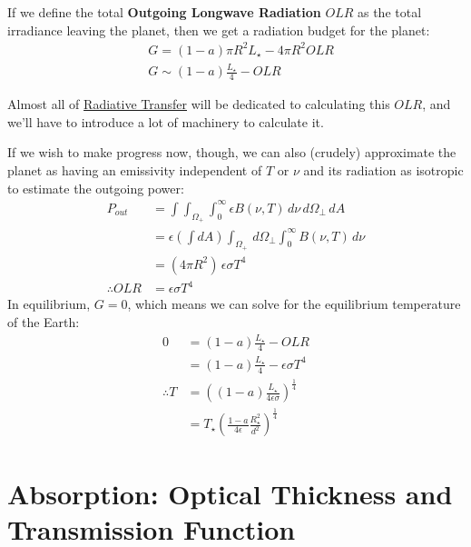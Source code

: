If we define the total \textbf{Outgoing Longwave Radiation} $OLR$ as the total irradiance leaving the planet, then we get a radiation budget for the planet:
\begin{align}
   & G  = (1-a)\pi R^2 L_\star - 4\pi R^2 OLR \nonumber\\
   & \boxed{G \sim (1-a) \frac{L_\star}{4} - OLR}\label{Rad budget}
\end{align}

Almost all of \hyperref[Radiative Transfer]{Radiative Transfer} will be dedicated to calculating this $OLR$, and we'll have to introduce a lot of machinery to calculate it.

If we wish to make progress now, though, we can also (crudely) approximate the planet as having an emissivity independent of $T$ or $\nu$ and its radiation as isotropic to estimate the outgoing power:
\begin{align*}
    P_{out}&=\int\int_{\Omega_+}\int _0^\infty \epsilon B(\nu,T)\,d\nu\,d\Omega_\perp\,dA\\
    &=\epsilon\left(\int dA\right)\int_{\Omega_+}\,d\Omega_\perp\int _0^\infty B(\nu,T)\,d\nu\\
    &=(4\pi R^2)\,\epsilon\sigma T^4\\
    \therefore OLR &= \epsilon\sigma T^4
\end{align*}
In equilibrium, $G=0$, which means we can solve for the equilibrium temperature of the Earth:
\begin{align*}
    0&=(1-a) \frac{L_\star}{4} - OLR\\
    &=(1-a) \frac{L_\star}{4} - \epsilon\sigma T^4\\
    \therefore T &= \left( 
        (1-a) \frac{L_\star}{4\epsilon\sigma}
     \right)^{\frac{1}{4}}\\
    &=T_{\star}\left(
    \frac{1-a}{4\epsilon}\frac{R_{\star}^2}{d^2}
    \right)^\frac{1}{4}
\end{align*}

\section{Absorption: Optical Thickness and Transmission Function}

